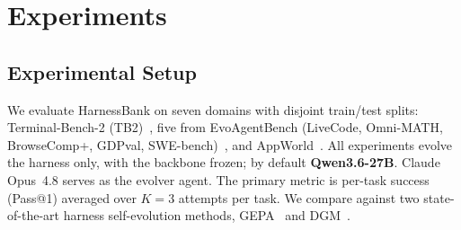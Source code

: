 \section{Experiments}
\label{sec:experiments}

\subsection{Experimental Setup}

We evaluate HarnessBank on seven domains with disjoint train/test splits: Terminal-Bench-2
(TB2)~\citep{merrill2026terminalbench}, five from EvoAgentBench (LiveCode, Omni-MATH,
BrowseComp+, GDPval, SWE-bench)~\citep{gao2026evoagentbench}, and
AppWorld~\citep{trivedi2024appworld}. All experiments evolve the harness only, with the
backbone frozen; by default \textbf{Qwen3.6-27B}. Claude Opus~4.8 serves as the evolver
agent. The primary metric is per-task success (Pass@1) averaged over $K{=}3$ attempts per
task. We compare against two state-of-the-art harness self-evolution methods,
GEPA~\citep{agrawal2026gepa} and DGM~\citep{zhang2026dgm}.
%



